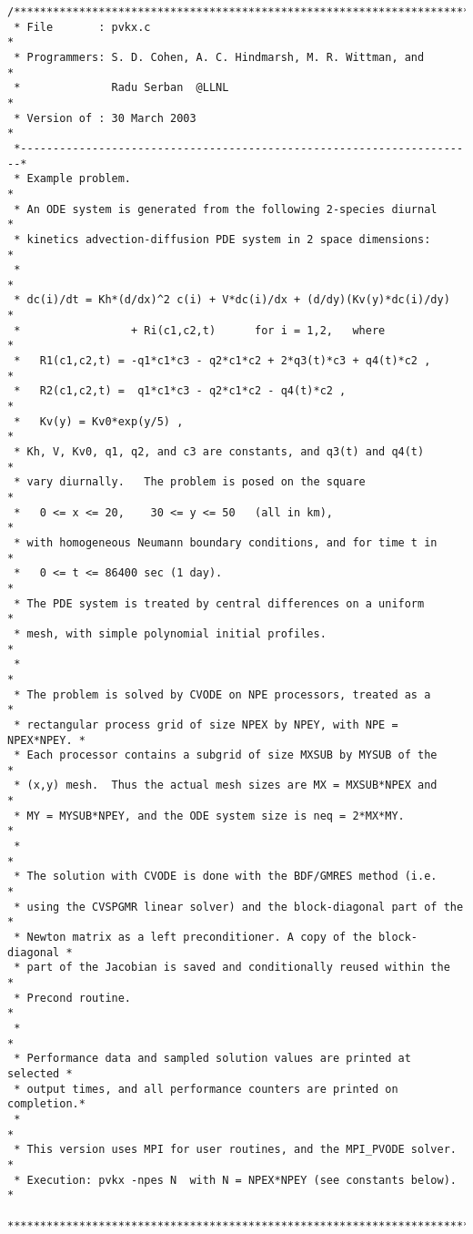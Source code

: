\begin{verbatim}
/************************************************************************
 * File       : pvkx.c                                                  *
 * Programmers: S. D. Cohen, A. C. Hindmarsh, M. R. Wittman, and        *
 *              Radu Serban  @LLNL                                      *
 * Version of : 30 March 2003                                           *
 *----------------------------------------------------------------------*
 * Example problem.                                                     *
 * An ODE system is generated from the following 2-species diurnal      *
 * kinetics advection-diffusion PDE system in 2 space dimensions:       *
 *                                                                      *
 * dc(i)/dt = Kh*(d/dx)^2 c(i) + V*dc(i)/dx + (d/dy)(Kv(y)*dc(i)/dy)    *
 *                 + Ri(c1,c2,t)      for i = 1,2,   where              *
 *   R1(c1,c2,t) = -q1*c1*c3 - q2*c1*c2 + 2*q3(t)*c3 + q4(t)*c2 ,       *
 *   R2(c1,c2,t) =  q1*c1*c3 - q2*c1*c2 - q4(t)*c2 ,                    *
 *   Kv(y) = Kv0*exp(y/5) ,                                             *
 * Kh, V, Kv0, q1, q2, and c3 are constants, and q3(t) and q4(t)        *
 * vary diurnally.   The problem is posed on the square                 *
 *   0 <= x <= 20,    30 <= y <= 50   (all in km),                      *
 * with homogeneous Neumann boundary conditions, and for time t in      *
 *   0 <= t <= 86400 sec (1 day).                                       *
 * The PDE system is treated by central differences on a uniform        *
 * mesh, with simple polynomial initial profiles.                       *
 *                                                                      *
 * The problem is solved by CVODE on NPE processors, treated as a       *
 * rectangular process grid of size NPEX by NPEY, with NPE = NPEX*NPEY. *
 * Each processor contains a subgrid of size MXSUB by MYSUB of the      *
 * (x,y) mesh.  Thus the actual mesh sizes are MX = MXSUB*NPEX and      *
 * MY = MYSUB*NPEY, and the ODE system size is neq = 2*MX*MY.           *
 *                                                                      *
 * The solution with CVODE is done with the BDF/GMRES method (i.e.      *
 * using the CVSPGMR linear solver) and the block-diagonal part of the  *
 * Newton matrix as a left preconditioner. A copy of the block-diagonal *
 * part of the Jacobian is saved and conditionally reused within the    *
 * Precond routine.                                                     *
 *                                                                      *
 * Performance data and sampled solution values are printed at selected *
 * output times, and all performance counters are printed on completion.*
 *                                                                      *
 * This version uses MPI for user routines, and the MPI_PVODE solver.   *   
 * Execution: pvkx -npes N  with N = NPEX*NPEY (see constants below).   *
 ************************************************************************/


\end{verbatim}
